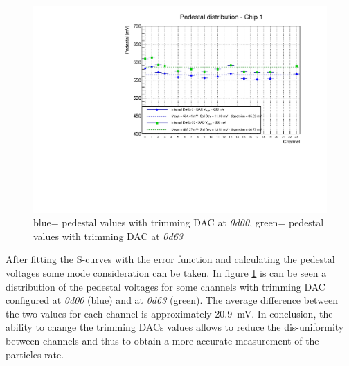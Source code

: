 \begin{figure}[H]
	\centering
	\includegraphics[width=0.8\linewidth]{IMG/ch5/DataDacConfig/DAC_V_REF_600mv-Copia.pdf}
	\caption{{\color{blue}blue}= pedestal values with trimming DAC at \textit{0d00}, {\color{green}green}= pedestal values with trimming DAC at \textit{0d63}}
	\label{fig:pedestal}
\end{figure}
\noindent After fitting the S-curves with the error function and calculating the pedestal voltages some mode consideration can be taken.
In figure \ref{fig:pedestal} is can be seen a distribution of the pedestal voltages for some channels with trimming DAC configured at \textit{0d00} (blue) and at \textit{0d63} (green).
The average difference between the two values for each channel is approximately 20.9~mV.
In conclusion, the ability to change the trimming DACs values allows to reduce the dis-uniformity between channels and thus to obtain a more accurate measurement of the particles rate.
\newpage
